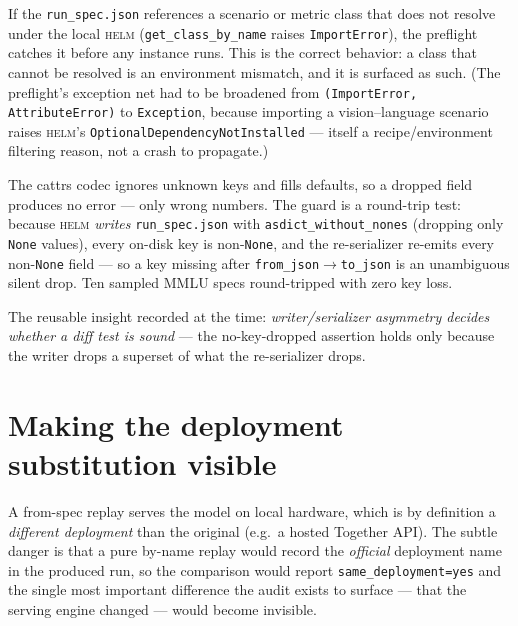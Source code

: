 \documentclass[11pt]{report}
\newcommand{\code}[1]{\texttt{#1}}
\newcommand{\file}[1]{\texttt{#1}}
\begin{document}
\begin{description}[style=nextline,leftmargin=1.25em]
  \item[Class drift is loud.] If the \file{run\_spec.json} references a scenario or
        metric class that does not resolve under the local \textsc{helm}
        (\code{get\_class\_by\_name} raises \code{ImportError}), the preflight
        catches it before any instance runs. This is the correct behavior: a class
        that cannot be resolved is an environment mismatch, and it is surfaced as
        such. (The preflight's exception net had to be broadened from
        \code{(ImportError, AttributeError)} to \code{Exception}, because importing
        a vision--language scenario raises \textsc{helm}'s
        \code{OptionalDependencyNotInstalled} --- itself a recipe/environment
        filtering reason, not a crash to propagate.)
  \item[Field drift is silent.] The cattrs codec ignores unknown keys and fills
        defaults, so a dropped field produces no error --- only wrong numbers.
        The guard is a round-trip test: because \textsc{helm} \emph{writes}
        \file{run\_spec.json} with \code{asdict\_without\_nones} (dropping only
        \code{None} values), every on-disk key is non-\code{None}, and the
        re-serializer re-emits every non-\code{None} field --- so a key missing
        after \code{from\_json}$\rightarrow$\code{to\_json} is an unambiguous silent
        drop. Ten sampled MMLU specs round-tripped with zero key loss.
\end{description}

The reusable insight recorded at the time: \emph{writer/serializer asymmetry
decides whether a diff test is sound} --- the no-key-dropped assertion holds only
because the writer drops a superset of what the re-serializer drops.

\section{Making the deployment substitution visible}

A from-spec replay serves the model on local hardware, which is by definition a
\emph{different deployment} than the original (e.g.\ a hosted Together API). The
subtle danger is that a pure by-name replay would record the \emph{official}
deployment name in the produced run, so the comparison would report
\code{same\_deployment=yes} and the single most important difference the audit
exists to surface --- that the serving engine changed --- would become invisible.
\end{document}
